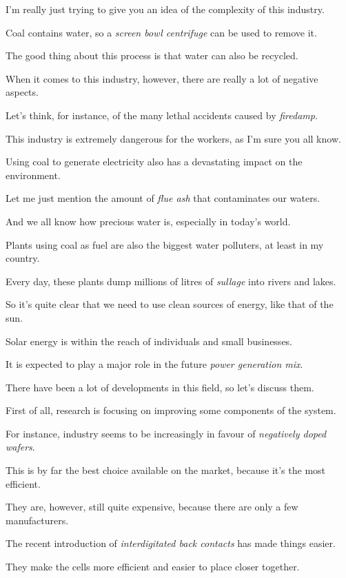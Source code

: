 \ex I'm really just trying to give you an idea of the complexity of this industry.

Coal contains water, so a \textit{screen bowl centrifuge} can be used to remove it.

The good thing about this process is that water can also be recycled.

\ex When it comes to this industry, however, there are really a lot of negative aspects.

Let's think, for instance, of the many lethal accidents caused by \textit{firedamp}.

This industry is extremely dangerous for the workers, as I'm sure you all know.

\ex Using coal to generate electricity also has a devastating impact on the environment.

Let me just mention the amount of \textit{flue ash} that contaminates our waters.

And we all know how precious water is, especially in today's world.

\ex Plants using coal as fuel are also the biggest water polluters, at least in my country.

Every day, these plants dump millions of litres of \textit{sullage} into rivers and lakes.

So it's quite clear that we need to use clean sources of energy, like that of the sun.

\ex Solar energy is within the reach of individuals and small businesses.

It is expected to play a major role in the future \textit{power generation mix}.

There have been a lot of developments in this field, so let's discuss them.

\ex First of all, research is focusing on improving some components of the system.

For instance, industry seems to be increasingly in favour of \textit{negatively doped wafers}.

This is by far the best choice available on the market, because it's the most efficient.

\ex They are, however, still quite expensive, because there are only a few manufacturers.

The recent introduction of \textit{interdigitated back contacts} has made things easier.

They make the cells more efficient and easier to place closer together.


